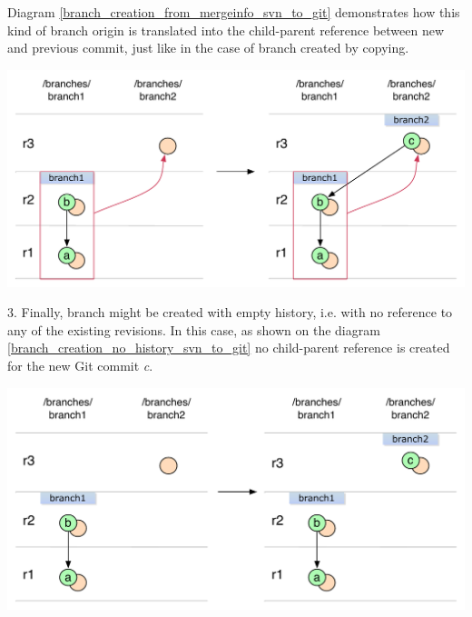 \\\\
Diagram \ref{branch_creation_from_mergeinfo_svn_to_git} demonstrates how this kind of branch origin 
is translated into the child-parent reference between new and previous commit, just like in the 
case of branch created by copying.
\begin{center}
\includegraphics[width=\textwidth]{img/diagrams/branch_creation_from_mergeinfo_svn_to_git.pdf}%
\label{branch_creation_from_mergeinfo_svn_to_git}%
\end{center}

3. Finally, branch might be created with empty history, i.e. with no reference to any of the existing 
revisions. In this case, as shown on the diagram \ref{branch_creation_no_history_svn_to_git} no child-parent
reference is created for the new Git commit \emph{c}. %

\begin{center}
\includegraphics[width=\textwidth]{img/diagrams/branch_creation_no_history_svn_to_git.pdf}%
\label{branch_creation_no_history_svn_to_git}%
\end{center}

